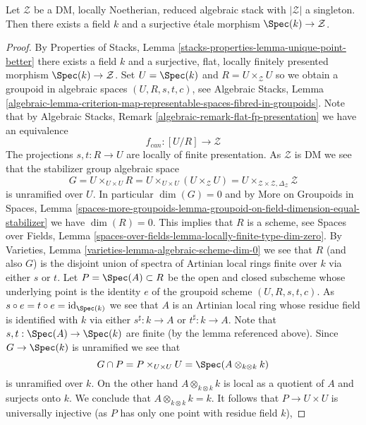 \begin{lemma}
\label{lemma-DM-residual-gerbe}
Let $\mathcal{Z}$ be a DM, locally Noetherian, reduced algebraic stack
with $|\mathcal{Z}|$ a singleton. Then there exists a field $k$ and
a surjective \'etale morphism $\Spec(k) \to \mathcal{Z}$.
\end{lemma}

\begin{proof}
By
Properties of Stacks, Lemma \ref{stacks-properties-lemma-unique-point-better}
there exists a field $k$ and a surjective, flat, locally finitely presented
morphism $\Spec(k) \to \mathcal{Z}$. Set $U = \Spec(k)$ and
$R = U \times_\mathcal{Z} U$ so we obtain a groupoid in algebraic spaces
$(U, R, s, t, c)$, see
Algebraic Stacks, Lemma
\ref{algebraic-lemma-criterion-map-representable-spaces-fibred-in-groupoids}.
Note that by
Algebraic Stacks, Remark \ref{algebraic-remark-flat-fp-presentation}
we have an equivalence
$$
f_{can} : [U/R] \longrightarrow \mathcal{Z}
$$
The projections $s, t : R \to U$ are locally of finite presentation.
As $\mathcal{Z}$ is DM we see that the stabilizer group algebraic space
$$
G = U \times_{U \times U} R = U \times_{U \times U} (U \times_\mathcal{Z} U) =
U \times_{\mathcal{Z} \times \mathcal{Z}, \Delta_\mathcal{Z}} \mathcal{Z}
$$
is unramified over $U$. In particular $\dim(G) = 0$ and by
More on Groupoids in Spaces, Lemma
\ref{spaces-more-groupoids-lemma-groupoid-on-field-dimension-equal-stabilizer}
we have $\dim(R) = 0$. This implies that $R$ is a scheme, see
Spaces over Fields, Lemma
\ref{spaces-over-fields-lemma-locally-finite-type-dim-zero}.
By
Varieties, Lemma \ref{varieties-lemma-algebraic-scheme-dim-0}
we see that $R$ (and also $G$) is the disjoint union of spectra of
Artinian local rings finite over $k$ via either $s$ or $t$. Let
$P = \Spec(A) \subset R$ be the open and
closed subscheme whose underlying point is the identity $e$ of the groupoid
scheme $(U, R, s, t, c)$. As
$s \circ e = t \circ e = \text{id}_{\Spec(k)}$ we see that $A$
is an Artinian local ring whose residue field is identified with $k$
via either $s^\sharp : k \to A$ or $t^\sharp : k \to A$.
Note that $s, t : \Spec(A) \to \Spec(k)$
are finite (by the lemma referenced above). Since
$G \to \Spec(k)$ is unramified we see that
$$
G \cap P = P \times_{U \times U} U = \Spec(A \otimes_{k \otimes k} k)
$$
is unramified over $k$. On the other hand $A \otimes_{k \otimes k} k$
is local as a quotient of $A$ and surjects onto $k$. We conclude that
$A \otimes_{k \otimes k} k = k$. It follows that $P \to U \times U$
is universally injective (as $P$ has only one point with residue field $k$),

\end{proof}

